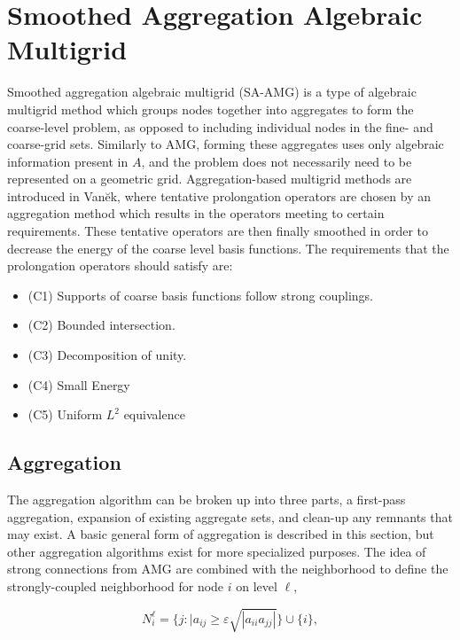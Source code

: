 
\section{Smoothed Aggregation Algebraic Multigrid}
Smoothed aggregation algebraic multigrid (SA-AMG) is a type of algebraic multigrid method which groups nodes together into aggregates to form the coarse-level problem, as opposed to including individual nodes in the fine- and coarse-grid sets. Similarly to AMG, forming these aggregates uses only algebraic information present in $A$, and the problem does not necessarily need to be represented on a geometric grid. Aggregation-based multigrid methods are introduced in Van\u{e}k, where tentative prolongation operators are chosen by an aggregation method which results in the operators meeting to certain requirements. These tentative operators are then finally smoothed in order to decrease the energy of the coarse level basis functions. The requirements that the prolongation operators should satisfy are:

\begin{itemize}
	\item (C1) Supports of coarse basis functions follow strong couplings.
	\item (C2) Bounded intersection.
	\item (C3) Decomposition of unity.
	\item (C4) Small Energy
	\item (C5) Uniform $L^2$ equivalence
\end{itemize}

\subsection{Aggregation}
The aggregation algorithm can be broken up into three parts, a first-pass aggregation, expansion of existing aggregate sets, and clean-up any remnants that may exist. A basic general form of aggregation is described in this section, but other aggregation algorithms exist for more specialized purposes. The idea of strong connections from AMG are combined with the neighborhood to define the strongly-coupled neighborhood for node $i$ on level $\ell$,

\begin{equation}
	N_i^\ell = \{ { j : |a_{ij} \geq \varepsilon \sqrt{|a_{ii} a_{jj} |}} \} \cup \{ i \},
\end{equation}

